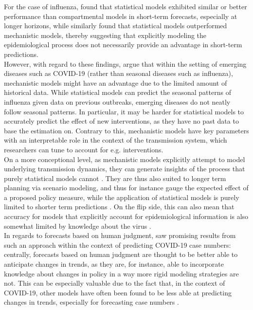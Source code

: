 For the case of influenza, \cite{reich_collaborative_2019} found that statistical models exhibited similar or better performance than compartmental models in short-term forecasts, especially at longer horizons, %
while \cite{mcgowan_collaborative_2019} similarly found that statistical models outperformed mechanistic models, thereby suggesting that explicitly modeling the epidemiological process does not necessarily provide an advantage in short-term predictions. \\
However, with regard to these findings, \cite{bracher_pre-registered_2021} argue that within the setting of emerging diseases such as COVID-19 (rather than seasonal diseases such as influenza), mechanistic models might have an advantage due to the limited amount of historical data. While statistical models can predict the seasonal patterns of influenza given data on previous outbreaks, emerging diseases do not neatly follow seasonal patterns. In particular, it may be harder for statistical models to accurately predict the effect of new interventions, as they have no past data to base the estimation on. Contrary to this, mechanistic models have key parameters with an interpretable role in the context of the transmission system, which researchers can tune to account for e.g. interventions.\\ 
On a more conceptional level, as mechanistic models explicitly attempt to model underlying transmission dynamics, they can generate insights of the process that purely statistical models cannot \citep{james_use_2021}. They are thus also suited to longer term planning via scenario modeling, and thus for instance gauge the expected effect of a proposed policy measure, while the application of statistical models is purely limited to shorter term predictions \citep{reich_collaborative_2022}. On the flip side, this can also mean that accuracy for models that explicitly account for epidemiological information is also somewhat limited by knowledge about the virus \citep{holmdahl_wrong_2020}. \\
In regards to forecasts based on human judgment, \cite{bosse_comparing_2021-1} saw promising results from such an approach within the context of predicting COVID-19 case numbers: centrally, forecasts based on human judgment are thought to be better able to anticipate changes in trends, as they are, for instance, able to incorporate knowledge about changes in policy in a way more rigid modeling strategies are not. This can be especially valuable due to the fact that, in the context of COVID-19, other models have often been found to be less able at predicting changes in trends, especially for forecasting case numbers \citep{ray_challenges_2021}. \medskip \\
